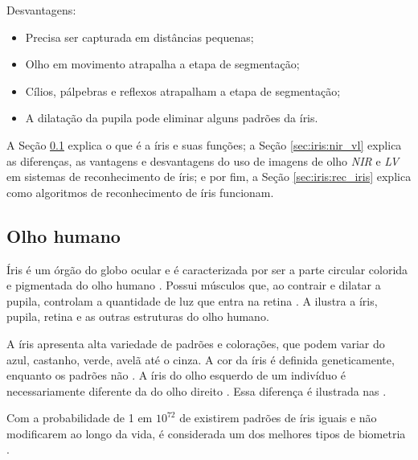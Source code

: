 \par Desvantagens:

\begin{itemize}
    \item Precisa ser capturada em distâncias pequenas;
    \item Olho em movimento atrapalha a etapa de segmentação;
    \item Cílios, pálpebras e reflexos atrapalham a etapa de segmentação;
    \item A dilatação da pupila pode eliminar alguns padrões da íris.
\end{itemize}

\par A Seção \ref{sec:iris:olho} explica o que é a íris e suas funções; a Seção \ref{sec:iris:nir_vl} explica as diferenças, as vantagens e desvantagens do uso de imagens de olho \textit{\acrfull{NIR}} e \textit{\acrfull{LV}} em sistemas de reconhecimento de íris; e por fim, a Seção \ref{sec:iris:rec_iris} explica como algoritmos de reconhecimento de íris funcionam.

\subsection{Olho humano}\label{sec:iris:olho}

\par Íris é um órgão do globo ocular e é caracterizada por ser a parte circular colorida e pigmentada do olho humano \cite{irisDaugman}. Possui músculos que, ao contrair e dilatar a pupila, controlam a quantidade de luz que entra na retina \cite{adlerIris2003}. A  ilustra a íris, pupila, retina e as outras estruturas do olho humano.

%

\par A íris apresenta alta variedade de padrões e colorações, que podem variar do azul, castanho, verde, avelã até o cinza. A cor da íris é definida geneticamente, enquanto os padrões não \cite{adlerIris2003}. A íris do olho esquerdo de um indivíduo é necessariamente diferente da do olho direito \cite{wayman2005biometric}. Essa diferença é ilustrada nas .

\par Com a probabilidade de 1 em $10^{72}$ de existirem padrões de íris iguais e não modificarem ao longo da vida, é considerada um dos melhores tipos de biometria \cite{iris_UFRJ}.

